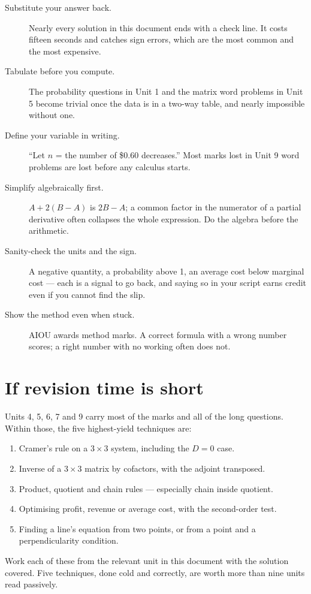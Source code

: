 \begin{description}
  \item[Substitute your answer back.] Nearly every solution in this document
        ends with a check line. It costs fifteen seconds and catches sign
        errors, which are the most common and the most expensive.
  \item[Tabulate before you compute.] The probability questions in Unit 1 and
        the matrix word problems in Unit 5 become trivial once the data is in a
        two-way table, and nearly impossible without one.
  \item[Define your variable in writing.] ``Let $n$ = the number of \$0.60
        decreases.'' Most marks lost in Unit 9 word problems are lost before
        any calculus starts.
  \item[Simplify algebraically first.] $A+2(B-A)$ is $2B-A$; a common factor in
        the numerator of a partial derivative often collapses the whole
        expression. Do the algebra before the arithmetic.
  \item[Sanity-check the units and the sign.] A negative quantity, a
        probability above 1, an average cost below marginal cost --- each is a
        signal to go back, and saying so in your script earns credit even if
        you cannot find the slip.
  \item[Show the method even when stuck.] AIOU awards method marks. A correct
        formula with a wrong number scores; a right number with no working
        often does not.
\end{description}

\section{If revision time is short}

Units 4, 5, 6, 7 and 9 carry most of the marks and all of the long questions.
Within those, the five highest-yield techniques are:

\begin{enumerate}
  \item Cramer's rule on a $3\times3$ system, including the $D=0$ case.
  \item Inverse of a $3\times3$ matrix by cofactors, with the adjoint transposed.
  \item Product, quotient and chain rules --- especially chain inside quotient.
  \item Optimising profit, revenue or average cost, with the second-order test.
  \item Finding a line's equation from two points, or from a point and a
        perpendicularity condition.
\end{enumerate}

Work each of these from the relevant unit in this document with the solution
covered. Five techniques, done cold and correctly, are worth more than
nine units read passively.
